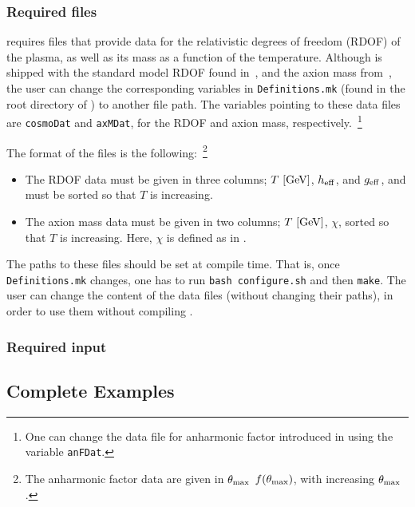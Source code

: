\documentclass[11pt,a4paper]{article}
\begin{document}
\subsubsection{Required files} \mimes requires files that provide data for the relativistic degrees of freedom (RDOF) of the plasma, as well as its mass as a function of the temperature. Although \mimes is shipped with the standard model RDOF found in~\cite{Saikawa:2020swg}, and the axion mass from~\cite{Borsanyi:2016ksw}, the user can change the corresponding variables in {\tt Definitions.mk} (found in the root directory of \mimes) to another file path. The variables pointing to these data files are {\tt cosmoDat} and {\tt axMDat}, for the RDOF and axion mass, respectively.~\footnote{One can change the data file for anharmonic factor introduced in  using the variable {\tt anFDat}.}

The format of the files is the following:~\footnote{The anharmonic factor data are given in $\theta_{\rm max}{}$ $f(\theta_{\rm max}{})$, with increasing $\theta_{\rm max}{}$.} 
%
\begin{itemize}
	\item The RDOF data must be given in three columns; $T ~[{\rm GeV}]$, $h_{\rm eff}{}$, and $g_{\rm eff}{}$, and must be sorted so that $T$ is increasing.
	\item The axion mass data must be given in two columns; $T ~[{\rm GeV}]$, $\chi$, sorted so that $T$ is increasing. Here, $\chi$ is defined as in . 
\end{itemize}
%
The paths to these files should be set at compile time. That is, once {\tt Definitions.mk} changes, one has to run {\tt bash configure.sh} and then {\tt make}. The user can change the content of the data files (without changing their paths), in order to use them without compiling \mimes.

\subsubsection{Required input}



\subsection{Complete Examples}\label{sec:complete_examples}
\end{document}
